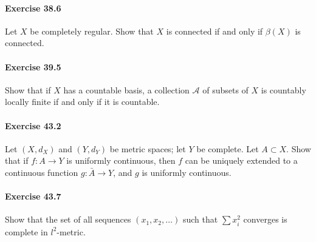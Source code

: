 \documentclass{article}
\begin{document}
\paragraph{Exercise 38.6} Let $X$ be completely regular. Show that $X$ is connected if and only if $\beta(X)$ is connected.

\paragraph{Exercise 39.5} Show that if $X$ has a countable basis, a collection $\mathcal{A}$ of subsets of $X$ is countably locally finite if and only if it is countable.

\paragraph{Exercise 43.2} Let $(X, d_X)$ and $(Y, d_Y)$ be metric spaces; let $Y$ be complete. Let $A \subset X$. Show that if $f \colon A \rightarrow Y$ is uniformly continuous, then $f$ can be uniquely extended to a continuous function $g \colon \bar{A} \rightarrow Y$, and $g$ is uniformly continuous.

\paragraph{Exercise 43.7} Show that the set of all sequences $(x_1, x_2, \ldots)$ such that $\sum x_i^2$ converges is complete in $l^2$-metric.
\end{document}
